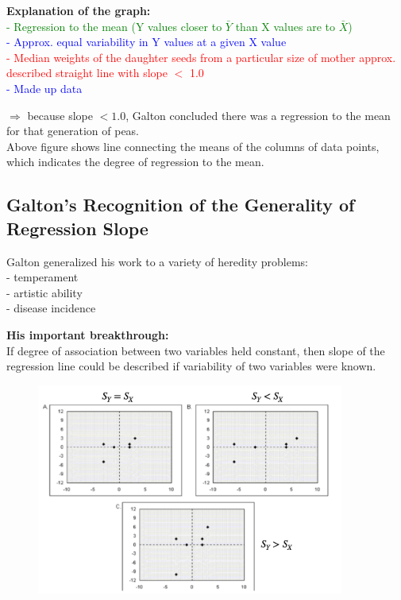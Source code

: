 \documentclass[14pt]{extarticle}
\begin{document}
\noindent \textbf{Explanation of the graph:} \\
\noindent \textcolor{green}{- Regression to the mean (Y values closer to $\bar{Y}$ than X values are to $\bar{X}$)}\\
\noindent \textcolor{blue}{- Approx. equal variability in Y values at a given X value}\\
\noindent \textcolor{red}{- Median weights of the daughter seeds from a particular size of mother approx. described straight line with slope $<$ 1.0} \\
\noindent \textcolor{blue}{- Made up data}

\noindent
$\Rightarrow$ because slope $< 1.0$, Galton concluded there was a regression to the mean for that generation of peas.\\

\noindent
Above figure shows line connecting the means of the columns of data points, which indicates the degree of regression to the mean.

\subsection*{Galton's Recognition of the Generality of Regression Slope}

\noindent
Galton generalized his work to a variety of heredity problems:\\
 - temperament \\
 - artistic ability\\
 - disease incidence

\noindent
\textbf{His important breakthrough:} \\
If degree of association between two variables held constant, then slope of the regression line could be described if variability of two variables were known.

\begin{figure}[H]
    \centering
    \includegraphics[width=0.9\textwidth]{fig3.png}
\end{figure}
\end{document}
